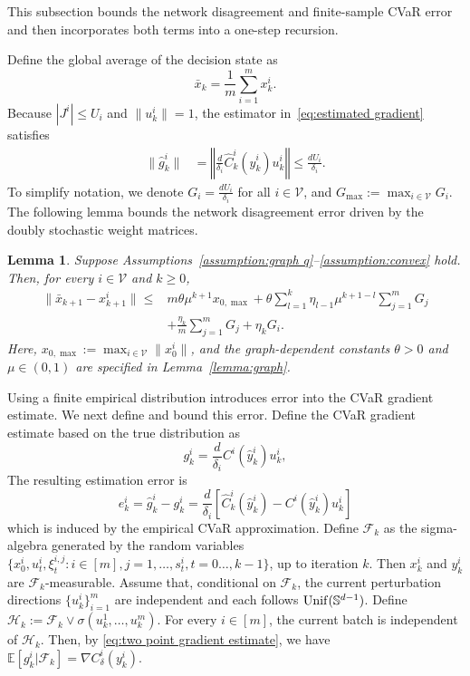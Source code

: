 \documentclass[twocolumn]{autart}    %
\newcommand{\brk}[1]{\left[#1\right]}
\newcommand{\norm}[1]{\left\Vert #1 \right\Vert}
\newtheorem{lemma}{Lemma}
\newcommand{\1}{\mathbf{1}}
\begin{document}
This subsection bounds the network disagreement and finite-sample CVaR error and then incorporates both terms into a one-step recursion.

Define the global average of the decision state as 
$$\bar{x}_k = \frac{1}{m}\sum_{i=1}^m x_{k}^i.$$ 
Because $|J^i|\le U_i$ and $\|u_k^i\|=1$, the estimator in~\eqref{eq:estimated gradient} satisfies
\begin{align}\label{eq:gradient bound}
\|\hat{g}_k^i\| &= \norm{ \frac{d}{\delta_i}  \widehat{C}_k^i(\hat{y}_k^i) u_k^i }  \le \frac{dU_i}{\delta_i}     .
\end{align}
To simplify notation, we denote $G_i = \frac{dU_i}{\delta_i}$ for all $ i \in \mathcal{V}$, and $G_{\max} := \max_{i\in\mathcal{V}} G_i$.   
The following lemma bounds the network disagreement error driven by the doubly stochastic weight matrices.
\begin{lemma}\cite[Lemma 4.1]{sundhar2010distributed}
\label{lemma:disagreement}
Suppose Assumptions~\ref{assumption:graph q}--\ref{assumption:convex} hold. Then, for every $i\in\mathcal V$ and $k\ge0$,
\begin{align}\label{eq:disagreement}
\|\bar{x}_{k+1} - x_{k+1}^i\| 
\leq &  m\theta\mu^{k+1}  x_{0,\max} + \theta \sum_{l=1}^k \eta_{l-1} \mu^{k+1-l} \sum_{j=1}^m G_j  \nonumber\\
&+ \frac{\eta_k}{m} \sum_{j=1}^m G_j + \eta_k G_i.
\end{align}  
Here, $x_{0,\max}:=\max_{i\in\mathcal V}\|x_0^i\|$, and the graph-dependent constants $\theta>0$ and $\mu\in(0,1)$ are specified in Lemma~\ref{lemma:graph}.
\end{lemma}

Using a finite empirical distribution introduces error into the CVaR gradient estimate. We next define and bound this error.
Define the CVaR gradient estimate based on the true distribution as 
\begin{equation*}
g_k^i = \frac{d}{\delta_i}C^i(\hat{y}_k^i )u_k^i, 
\end{equation*} 
The resulting estimation error is
\begin{equation}\label{eq:cvar gradient error}
e_k^i = \hat{g}_k^i- g_k^i = \frac{d}{\delta_i}\brk{{ \widehat{C}_k^i (\hat{y}_k^i) - C^i(\hat{y}_k^i )    }u_k^i} 
\end{equation}
which is induced by the empirical CVaR approximation. 
Define $\mathcal{F}_k$ as the sigma-algebra generated by the random variables $\{x_0^i,u_t^i,\xi_t^{i,j}:i\in[m],j=1,\dots,s_t^i,t=0\dots,k-1\}$, up to iteration $k$. Then $x_k^i$ and $y_k^i$ are $\mathcal{F}_k$-measurable. Assume that, conditional on $\mathcal F_k$, the current perturbation directions $\{u_k^i\}_{i=1}^m$ are independent and each follows ${\rm Unif}(\mathbb S^{d-1})$.
Define
$\mathcal H_k := \mathcal F_k \vee \sigma(u_k^1,\ldots,u_k^m)$.
For every $i\in[m]$, the current batch is independent of $\mathcal H_k$.
Then, by \eqref{eq:two point gradient estimate}, we have
$\mathbb{E} \brk{ g_k^i | \mathcal{F}_k  } = \nabla C_\delta^i(y_k^i)$.
 
\end{document}
